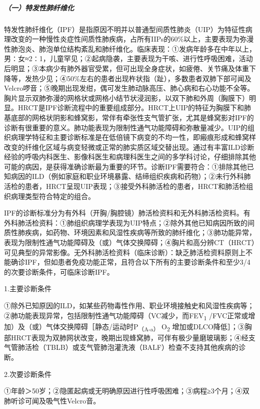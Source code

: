 \subparagraph{（一）特发性肺纤维化}

特发性肺纤维化（IPF）是指原因不明并以普通型间质性肺炎（UIP）为特征性病理改变的一种慢性炎症性间质性肺疾病，占所有IIPs的60\%以上，主要表现为弥漫性肺泡炎、肺泡单位结构紊乱和肺纤维化。临床表现：①发病年龄多在中年以上，男∶女≈2∶1，儿童罕见；②起病隐袭，主要表现为干咳、进行性呼吸困难，活动后明显；③本病少有肺外器官受累，但可出现全身症状，如疲倦、关节痛及体重下降等，发热少见；④50\%左右的患者出现杵状指（趾），多数患者双肺下部可闻及Velcro啰音；⑤晚期出现发绀，偶可发生肺动脉高压、肺心病和右心功能不全等。胸片显示双肺弥漫的网格状或网格小结节状浸润影，以双下肺和外周（胸膜下）明显。HRCT是IPF诊断流程中的重要组成部分。HRCT上UIP的特征为胸膜下和肺基底部的网格状阴影和蜂窝影，常伴有牵张性支气管扩张，尤其是蜂窝影对IPF的诊断有很重要的意义。肺功能表现为限制性通气功能障碍和弥散量减少。UIP的组织病理学特征和主要诊断标准是在低倍镜下病变的不均一性，即瘢痕形成和蜂窝样改变的纤维化区域与病变轻微或正常的肺实质区域交替出现。通过有丰富ILD诊断经验的呼吸内科医生、影像科医生和病理科医生之间的多学科讨论，仔细排除其他可能的病因，是获得准确诊断最为重要的环节。诊断IPF需要符合：①排除其他已知病因的ILD（例如家庭和职业环境暴露、结缔组织疾病和药物）；②未行外科肺活检的患者，HRCT呈现UIP表现；③接受外科肺活检的患者，HRCT和肺活检组织病理类型符合特定的组合。

IPF的诊断标准分为有外科（开胸/胸腔镜）肺活检资料和无外科肺活检资料。有外科肺活检资料：①肺组织病理学表现为UIP特点；②除外其他已知病因所致的间质性肺疾病，如药物、环境因素和风湿性疾病等所致的肺纤维化；③肺功能异常，表现为限制性通气功能障碍及（或）气体交换障碍；④胸片和高分辨CT（HRCT）可见典型的异常影像。无外科肺活检资料（临床诊断）：缺乏肺活检资料原则上不能确诊IPF，但如患者免疫功能正常，且符合以下所有的主要诊断条件和至少3/4的次要诊断条件，可临床诊断IPF。

\hypertarget{text00046.htmlux5cux23CHP3-4-5-3-3-1-1}{}
1.主要诊断条件

①除外已知原因的ILD，如某些药物毒性作用、职业环境接触史和风湿性疾病等；②肺功能表现异常，包括限制性通气功能障碍（VC减少，而FEV\textsubscript{1}
/FVC正常或增加）及（或）气体交换障碍［静态/运动时P\textsubscript{（A-a）}
O\textsubscript{2}
增加或DLCO降低］；③胸部HRCT表现为双肺网状改变，晚期出现蜂窝肺，可伴有极少量磨玻璃影；④经支气管肺活检（TBLB）或支气管肺泡灌洗液（BALF）检查不支持其他疾病的诊断。

\hypertarget{text00046.htmlux5cux23CHP3-4-5-3-3-1-2}{}
2.次要诊断条件

①年龄＞50岁；②隐匿起病或无明确原因进行性呼吸困难；③病程≥3个月；④双肺听诊可闻及吸气性Velcro音。


